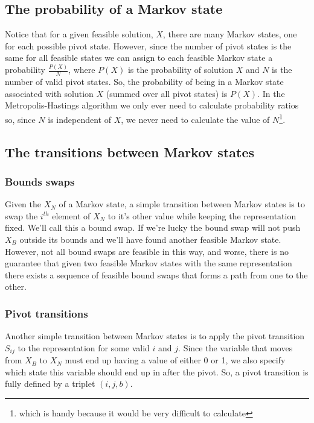 \documentclass{article}
\begin{document}
\subsection{The probability of a Markov state}

Notice that for a given feasible solution, $X$, there are many Markov states, one for each possible pivot state. However, since the number of pivot states is the same for all feasible states we can assign to each feasible Markov state a probability $\frac{P(X)}{N}$, where $P(X)$ is the probability of solution $X$ and $N$ is the number of valid pivot states. So, the probability of being in a Markov state associated with solution $X$ (summed over all pivot states) is $P(X)$. In the Metropolis-Hastings algorithm we only ever need to calculate probability ratios so, since $N$ is independent of $X$, we never need to calculate the value of $N$\footnote{which is handy because it would be very difficult to calculate}.

\subsection{The transitions between Markov states}

\subsubsection{Bounds swaps}
Given the $X_N$ of a Markov state, a simple transition between Markov states is to swap the $i^{th}$ element of $X_N$ to it's other value while keeping the representation fixed. We'll call this a bound swap. If we're lucky the bound swap will not push $X_B$ outside its bounds and we'll have found another feasible Markov state. However, not all bound swaps are feasible in this way, and worse, there is no guarantee that given two feasible Markov states with the same representation there exists a sequence of feasible bound swaps that forms a path from one to the other.

\subsubsection{Pivot transitions}
Another simple transition between Markov states is to apply the pivot transition $S_{ij}$ to the representation for some valid $i$ and $j$. Since the variable that moves from $X_B$ to $X_N$ must end up having a value of either 0 or 1, we also specify which state this variable should end up in after the pivot. So, a pivot transition is fully defined by a triplet $(i,j,b)$.
\end{document}
